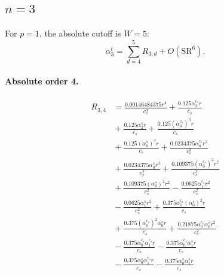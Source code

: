 \documentclass[10pt]{article}
\begin{document}
\subsection{$n=3$}
For $p=1$, the absolute cutoff is $W=5$:
\[\alpha_{3}^t=\sum_{d=4}^{5}R_{3,d}+O(\mathrm{SR}^{6}).\]
\paragraph{Absolute order 4.}
\begin{align*}
R_{3,4} &= \frac{0.00146484375 r^{4}}{c_{s}^{4}} + \frac{0.125 \alpha_{2}^{c_s} r}{c_{s}} \\
&{}  + \frac{0.125 \alpha_{2}^s r}{c_{s}} + \frac{0.125 \left(\alpha_{0}^{c_s}\right)^{3} r}{c_{s}} \\
&{}  + \frac{0.125 \left(\alpha_{0}^s\right)^{3} r}{c_{s}} + \frac{0.0234375 \alpha_{0}^{c_s} r^{3}}{c_{s}^{3}} \\
&{}  + \frac{0.0234375 \alpha_{0}^s r^{3}}{c_{s}^{3}} + \frac{0.109375 \left(\alpha_{0}^{c_s}\right)^{2} r^{2}}{c_{s}^{2}} \\
&{}  + \frac{0.109375 \left(\alpha_{0}^s\right)^{2} r^{2}}{c_{s}^{2}} - \frac{0.0625 \alpha_{1}^{c_s} r^{2}}{c_{s}^{2}} \\
&{}  - \frac{0.0625 \alpha_{1}^s r^{2}}{c_{s}^{2}} + \frac{0.375 \alpha_{0}^{c_s} \left(\alpha_{0}^s\right)^{2} r}{c_{s}} \\
&{}  + \frac{0.375 \left(\alpha_{0}^{c_s}\right)^{2} \alpha_{0}^s r}{c_{s}} + \frac{0.21875 \alpha_{0}^{c_s} \alpha_{0}^s r^{2}}{c_{s}^{2}} \\
&{}  - \frac{0.375 \alpha_{0}^{c_s} \alpha_{1}^{c_s} r}{c_{s}} - \frac{0.375 \alpha_{0}^{c_s} \alpha_{1}^s r}{c_{s}} \\
&{}  - \frac{0.375 \alpha_{0}^s \alpha_{1}^{c_s} r}{c_{s}} - \frac{0.375 \alpha_{0}^s \alpha_{1}^s r}{c_{s}}
\end{align*}
\end{document}
